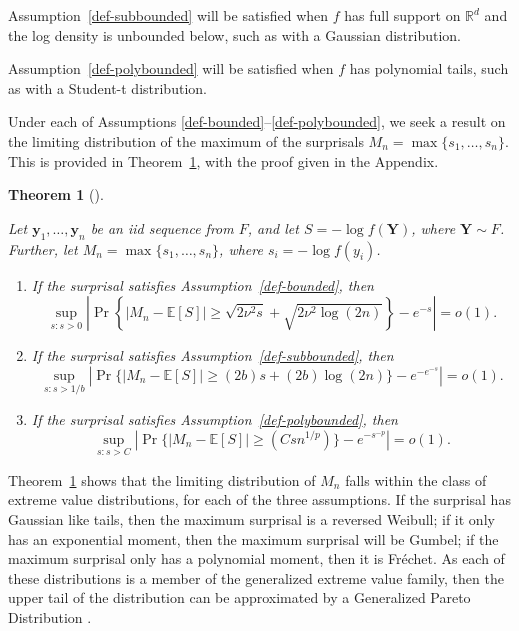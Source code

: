 \documentclass[
  12pt]{article}
\providecommand{\tightlist}{%
  \setlength{\itemsep}{0pt}\setlength{\parskip}{0pt}}
\newcommand{\E}{\mathbb{E}}
\theoremstyle{plain}
\newtheorem{theorem}{Theorem}[section]
\theoremstyle{plain}
\theoremstyle{definition}
\theoremstyle{plain}
\theoremstyle{remark}
\begin{document}
Assumption~\ref{def-subbounded} will be satisfied when \(f\) has full
support on \(\mathbb{R}^d\) and the log density is unbounded below, such
as with a Gaussian distribution.

Assumption~\ref{def-polybounded} will be satisfied when \(f\) has
polynomial tails, such as with a Student-t distribution.

Under each of Assumptions \ref{def-bounded}--\ref{def-polybounded}, we
seek a result on the limiting distribution of the maximum of the
surprisals \(M_n = \max\{s_1,\dots,s_n\}\). This is provided in
Theorem~\ref{thm-three_types}, with the proof given in the Appendix.

\begin{theorem}[]\protect\hypertarget{thm-three_types}{}\label{thm-three_types}

Let \(\bm{y}_1,\dots,\bm{y}_n\) be an iid sequence from \(F\), and let
\(S =-\log f(\bm{Y})\), where \(\bm{Y}\sim F\). Further, let
\(M_n=\max\{s_1,\dots,s_n\}\), where \(s_i=-\log f(y_i)\).

\begin{enumerate}
\def\labelenumi{\arabic{enumi}.}
\tightlist
\item
  If the surprisal satisfies Assumption~\ref{def-bounded}, then \[
    \sup_{s:s>0}\left|\Pr\left\{\big|M_n-\E[S]\big|\ge \sqrt{2\nu^2 s}+\sqrt{2\nu^2\log(2n)}\right\}-e^{-s}\right|=o(1).
  \]
\item
  If the surprisal satisfies Assumption~\ref{def-subbounded}, then \[
    \sup_{s:s>1/b}\left|\Pr\Big\{\big|M_n-\E[S]\big|\ge (2b)s+(2b)\log(2n)\Big\}-e^{-e^{-s}}\right|=o(1).
  \]
\item
  If the surprisal satisfies Assumption~\ref{def-polybounded}, then \[
   \sup_{s:s>C}\left|\Pr\Big\{\big|M_n-\E[S]\big|\ge (Csn^{1/p})\Big\}-e^{-s^{-p}}\right|=o(1).
  \]
\end{enumerate}

\end{theorem}

Theorem~\ref{thm-three_types} shows that the limiting distribution of
\(M_n\) falls within the class of extreme value distributions, for each
of the three assumptions. If the surprisal has Gaussian like tails, then
the maximum surprisal is a reversed Weibull; if it only has an
exponential moment, then the maximum surprisal will be Gumbel; if the
maximum surprisal only has a polynomial moment, then it is Fréchet. As
each of these distributions is a member of the generalized extreme value
family, then the upper tail of the distribution can be approximated by a
Generalized Pareto Distribution \citep[Theorem
4.1]{coles2001introduction}.
\end{document}
